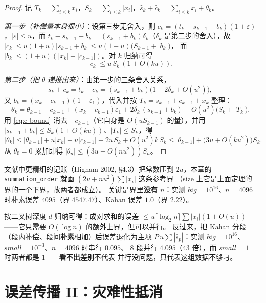 \begin{proof}
记 $T_k=\sum_{i\le k}x_i$，$S_k=\sum_{i\le k}|x_i|$，$\hat s_k+\hat c_k=\sum_{i\le k}x_i+\theta_k$。

\emph{第一步（补偿量本身很小）}：设第三步无舍入，则
$c_k=(t_k-s_{k-1}-b_k)(1+\varepsilon)$，$|\varepsilon|\le u$，而
$t_k-s_{k-1}-b_k=(s_{k-1}+b_k)\delta_k$（$\delta_k$ 是第二步的舍入），故
$|c_k|\le u(1+u)|s_{k-1}+b_k|\le u(1+u)\bigl(S_{k-1}+|b_k|\bigr)$，
而 $|b_k|\le(1+u)(|x_k|+|c_{k-1}|)$。对 $k$ 归纳可得
\begin{equation}
\label{eq:c-bound}
  |c_k|\le u\,S_k\,(1+O(ku)).
\end{equation}

\emph{第二步（把 $\theta$ 递推出来）}：由第一步的三条舍入关系，
\[
  s_k+c_k=t_k+c_k=(s_{k-1}+b_k)\bigl(1+2\delta_k+O(u^2)\bigr),
\]
又 $b_k=(x_k-c_{k-1})(1+\varepsilon_1)$，代入并按 $T_k=s_{k-1}+c_{k-1}+x_k$ 整理：
\[
  \theta_k=\theta_{k-1}-c_{k-1}+(x_k-c_{k-1})\varepsilon_1+2\delta_k\,(s_{k-1}+b_k)+O(u^2)\bigl(S_k+|T_k|\bigr).
\]
用 \eqref{eq:c-bound} 消去 $-c_{k-1}$（它自身是 $O(uS_{k-1})$ 的量），并用
$|s_{k-1}+b_k|\le S_k(1+O(ku))$、$|T_k|\le S_k$，得
\[
  |\theta_k|\le|\theta_{k-1}|+u|x_k|+u|c_{k-1}|+2u\,S_k+O(u^2)k\,S_k
  \le|\theta_{k-1}|+\bigl(3u+O(ku^2)\bigr)S_k .
\]
从 $\theta_0=0$ 累加即得 $|\theta_n|\le(3u+O(nu^2))S_n$。
\end{proof}

\begin{remark}[常数不是重点]
文献中更精细的记账（Higham 2002, \S4.3）把常数压到 $2u$，本章的
\texttt{summation\_order} 就画 $(2u+nu^2)\sum|x_i|$ 这条参考界
（size 上它是上面定理的界的一个下界，故两者都成立）。
关键是界里\textbf{没有 $n$}：实测 $big=10^{16}$、$n=4096$ 时朴素误差
$4095$（界 $4547.47$）、Kahan 误差 $1.0$（界 $2.22$）。
\end{remark}

\begin{remark}[成对求和与并行归约]
按二叉树深度 $d$ 归纳可得：成对求和的误差 $\le u\lceil\log_2 n\rceil\sum|x_i|(1+O(u))$
——它只需要 $O(\log n)$ 的额外上界，但可以并行。
反过来，把 Kahan 分段（段内补偿、段间\textbf{朴素}相加）后误差退化为主项
$P\,u\sum|\hat s_p|$：实测 $big=10^{16}$、$small=10^{-3}$、$n=4096$ 时串行 $0.095$、
$8$ 段并行 $4.095$（$43$ 倍），而 $small=1$ 时两者都是 $1$——\textbf{看不出差别}不代表
并行没问题，只代表这组数据不够刁。
\end{remark}

\section{误差传播 II：灾难性抵消}


